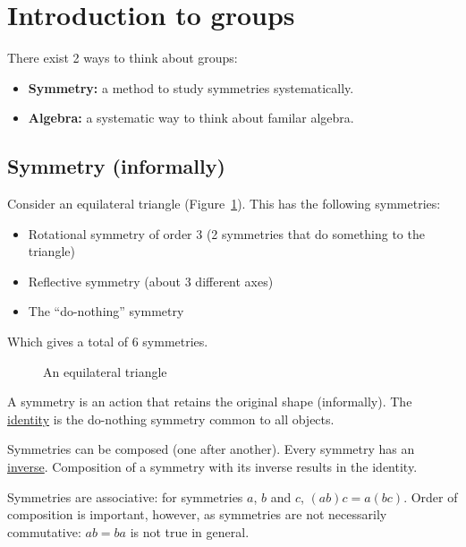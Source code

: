 \documentclass[../Main.tex]{subfiles}
\begin{document}
\section{Introduction to groups}
There exist 2 ways to think about groups:
\begin{itemize}
    \item \textbf{Symmetry:} a method to study symmetries systematically.
    \item \textbf{Algebra:} a systematic way to think about familar algebra.
\end{itemize}
\subsection{Symmetry (informally)}
Consider an equilateral triangle (Figure~\ref{figEquilateralTriangle}).
This has the following symmetries:
\begin{itemize}
    \item Rotational symmetry of order 3 (2 symmetries that do something to the triangle)
    \item Reflective symmetry (about 3 different axes)
    \item The ``do-nothing'' symmetry
\end{itemize}
Which gives a total of 6 symmetries.
\begin{figure}[ht]
    \centering
    \caption{An equilateral triangle}
    \label{figEquilateralTriangle}
\end{figure}
A symmetry is an action that retains the original shape (informally). The \underline{identity} is the do-nothing symmetry common to all objects.\par
Symmetries can be composed (one after another). Every symmetry has an \underline{inverse}. Composition of a symmetry with its inverse results in the identity.\par
Symmetries are associative: for symmetries $a$, $b$ and $c$, $(ab)c = a(bc)$. Order of composition is important, however, as symmetries are not necessarily commutative: $ab = ba$ is not true in general.
\end{document}
